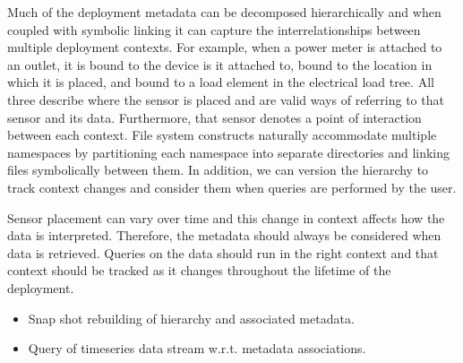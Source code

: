 Much of the deployment metadata can be decomposed hierarchically and when coupled with symbolic linking it can capture 
the interrelationships between multiple deployment contexts. For example, when a power meter is attached to an outlet, 
it is bound to the device is it attached to, bound to the location in which it is placed, and bound to a load element in 
the electrical load tree. All three describe where the sensor is placed and are valid ways of referring to that sensor and 
its data. Furthermore, that sensor denotes a point of interaction between each context. File system constructs naturally 
accommodate multiple namespaces by partitioning each namespace into separate directories and linking files symbolically 
between them. In addition, we can version the hierarchy to track context changes and consider them when queries are performed 
by the user.

Sensor placement can vary over time and this change in context affects how the data is interpreted. Therefore, the metadata should 
always be considered when data is retrieved. Queries on the data should run in the right context and that context should be tracked 
as it changes throughout the lifetime of the deployment.


\begin{itemize}
\item Snap shot rebuilding of hierarchy and associated metadata.
\item Query of timeseries data stream w.r.t. metadata associations.
\end{itemize}